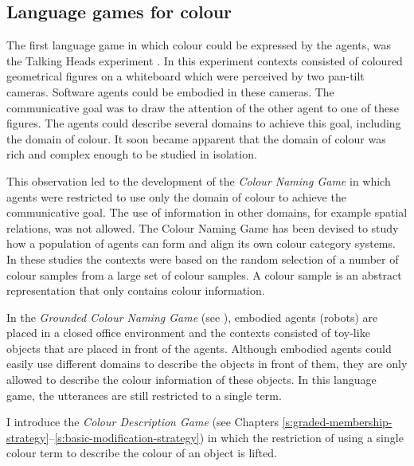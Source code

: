 \subsection{Language games for colour}
\label{s:language-games-for-colour}

The first language game in which colour could be expressed by the
agents, was the Talking Heads experiment
\citep{steels99talking}. In this experiment contexts consisted
of coloured geometrical figures on a whiteboard which were perceived
by two pan-tilt cameras. Software agents could be embodied in these
cameras. The communicative goal was to draw the attention of the other
agent to one of these figures. The agents could describe several
domains to achieve this goal, including the domain of colour. It soon
became apparent that the domain of colour was rich and complex enough
to be studied in isolation.

This observation led to the development of the \emph{Colour Naming
  Game} \citep{steels05coordinating,
  belpaeme05explaining, belpaeme07language, puglisi08cultural,
  baronchelli10modeling} in which agents were restricted to use only
the domain of colour to achieve the communicative goal. The use of
information in other domains, for example spatial relations, was not
allowed. The Colour Naming Game has been devised to study how a
population of agents can form and align its own colour category
systems. In these studies the contexts were based on the random
selection of a number of colour samples from a large set of
colour samples. A colour sample is an abstract representation that
only contains colour information.

In the \emph{Grounded Colour Naming Game} (see ),
embodied agents (ro\-bots) are placed in a closed office environment and
the contexts consisted of toy-like objects that are placed in front of
the agents. Although embodied agents could easily use different
domains to describe the objects in front of them, they are only
allowed to describe the colour information of these objects. In this
language game, the utterances are still restricted to a single term.

I introduce the \emph{Colour Description Game} (see Chapters
\ref{s:graded-membership-strategy}--\ref{s:basic-modification-strategy})
in which the restriction of using a single colour term to describe the
colour of an object is lifted.

